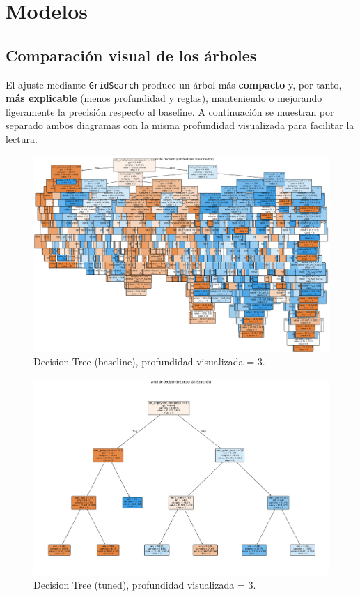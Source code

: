 \section{Modelos}

\subsection{Comparación visual de los árboles}
El ajuste mediante \texttt{GridSearch} produce un árbol más \textbf{compacto} y, por tanto, \textbf{más explicable} (menos profundidad y reglas), manteniendo o mejorando ligeramente la precisión respecto al baseline. A continuación se muestran por separado ambos diagramas con la misma profundidad visualizada para facilitar la lectura.

\begin{figure}[h]
  \centering
  \includegraphics[width=0.92\linewidth]{figures/decision_tree_baseline_depth.png}
  \caption{Decision Tree (baseline), profundidad visualizada = 3.}
  \label{fig:tree-base}
\end{figure}

\begin{figure}[h]
  \centering
  \includegraphics[width=0.92\linewidth]{figures/decision_tree_tunned_depth.png}
  \caption{Decision Tree (tuned), profundidad visualizada = 3.}
  \label{fig:tree-tuned}
\end{figure}











